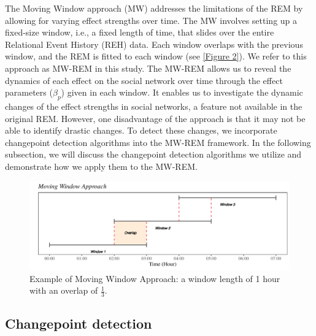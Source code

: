 \documentclass[]{interact}
\theoremstyle{plain}%
\theoremstyle{definition}
\theoremstyle{remark}
\begin{document}
	\hspace{0.23cm} The Moving Window approach (MW) \cite{mulderModelingEvolutionInteraction2019} addresses the limitations of the REM by allowing for varying effect strengths over time. The MW involves setting up a fixed-size window, i.e., a fixed length of time, that slides over the entire Relational Event History (REH) data. Each window overlaps with the previous window, and the REM is fitted to each window (see \autoref{Figure 2}). We refer to this approach as MW-REM in this study. The MW-REM allows us to reveal the dynamics of each effect on the social network over time through the effect parameters ($\beta_p$) given in each window. It enables us to investigate the dynamic changes of the effect strengths in social networks, a feature not available in the original REM. However, one disadvantage of the approach is that it may not be able to identify drastic changes. To detect these changes, we incorporate changepoint detection algorithms into the MW-REM framework. In the following subsection, we will discuss the changepoint detection algorithms we utilize and demonstrate how we apply them to the MW-REM.
	
    \begin{figure}[H]
    	\captionsetup{justification=raggedright}
    	\renewcommand{\figurename}{Figure}
    	\centering
    	\includegraphics[width=13cm]{MW}
    	\caption{\fontsize{8}{10}\selectfont Example of Moving Window Approach: a window length of 1 hour with an overlap of $\frac{1}{3}$.}
    	\label{Figure 2}
    \end{figure}
    
	
	\subsection{Changepoint detection} \label{sec:CP detection}
	
\end{document}
